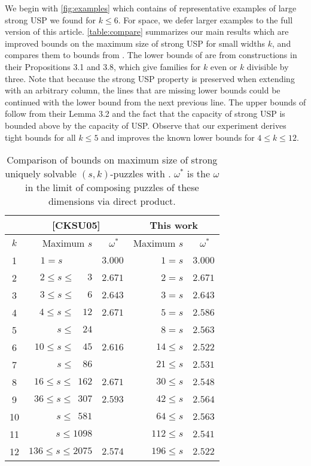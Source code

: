 \documentclass[11pt]{article}
\begin{document}
We begin with \autoref{fig:examples} which contains of representative
examples of large strong USP we found for $k \le 6$.  For space, we
defer larger examples to the full version of this article.
\autoref{table:compare} summarizes our main results which are improved
bounds on the maximum size of strong USP for
small widths $k$, and compares them to bounds from \cite{cksu05}.  The
lower bounds of \cite{cksu05} are from constructions in their
Propositions 3.1 and 3.8, which give families for $k$ even or $k$
divisible by three.  Note that because the strong USP property is preserved
when extending with an arbitrary column, the lines that are missing
lower bounds could be continued with the lower bound from the next
previous line.  The upper bounds of \cite{cksu05} follow from their
Lemma 3.2 and the fact that the capacity of strong USP is bounded above by
the capacity of USP.  Observe that our experiment derives tight bounds
for all $k \le 5$ and improves the known lower bounds for $4 \le k \le
12$.
\begin{table}[t]
  \begin{center}
  \begin{tabular}{|c|r|r|r|r|}
    \hline
    & \multicolumn{2}{|c|}{[CKSU05]} & \multicolumn{2}{|c|}{This work} \\
    \hline
    $k$ & Maximum $s$ & $\omega^*$~ & Maximum $s$ & $\omega^*$~\\
    \hline
    1 & $1 = s \;\,~~~~~~~~~~~~$ & $3.000$ & $1=s$ & $3.000$  \\
    2 & $2 \le s\le ~~~~~~3$ & $2.671$ & $2=s$ & $2.671$ \\
    3 & $3 \le s \le ~~~~~~6$ & $2.643$ & $3=s$ & $2.643$ \\
    4 & $4 \le s\le ~~~~12$ & $2.671$ & $5=s$ & $2.586$ \\
    5 & $ s\le ~~~~24$ &  & $8=s$ & $2.563$  \\
    6 & $10 \le s \le ~~~~45$ & $2.616$ &$14\le s$ & $2.522$\\
    7 & $s\le ~~~~86$ &  & $21\le s$ & $2.531$ \\
    8 & $16 \le s\le ~~162$ & $2.671$ & $30\le s$ & $2.548$ \\
    9 & $36 \le s \le ~~307$ & $2.593$ &$42\le s$ & $2.564$  \\
    10 & $s \le ~~581$ & & $64 \le s$ & $2.563$ \\ 
    11 & $s \le 1098$ &  & $112 \le s$ & $2.541$ \\
    12 & $136 \le s \le 2075$ & $2.574$ & $196 \le s$ & $2.522$ \\
    \hline
  \end{tabular}
  \end{center}
  \vspace{-2ex}
  \caption{Comparison of bounds on maximum size of strong uniquely
    solvable $(s,k)$-puzzles with \cite{cksu05}.  $\omega^*$ is the
    $\omega$ in the limit of composing puzzles of these dimensions via
    direct product.}
  \label{table:compare}
\end{table}
\end{document}
